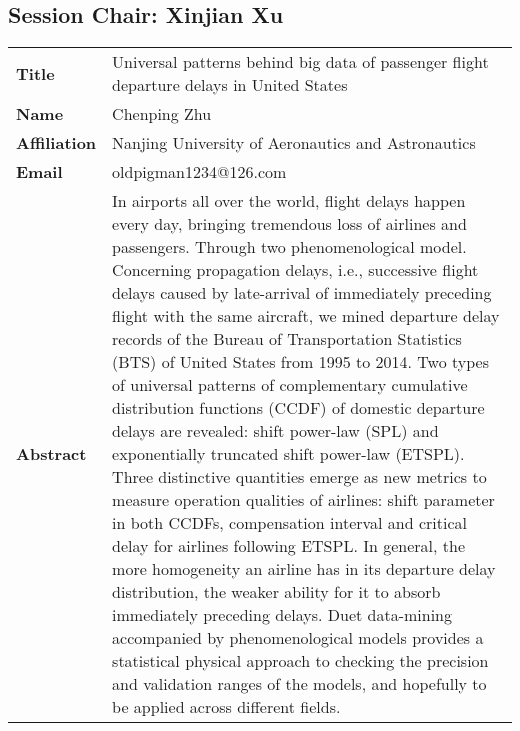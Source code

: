 \documentclass[oneside,A4paper,12pt]{article}
\begin{document}
\newpage
\subsection*{Session \uppercase\expandafter{}  \hspace{10mm} Chair: Xinjian Xu}
\label{sec:org876a3d0}

\begin{longtable}{p{2cm}p{14cm}}
\toprule
\textbf{Title} & Universal patterns behind big data of passenger flight departure delays in United States\\
\textbf{Name} & Chenping Zhu\\
\textbf{Affiliation} & Nanjing University of Aeronautics and Astronautics\\
\textbf{Email} & oldpigman1234@126.com\\
\textbf{Abstract} & In airports all over the world, flight delays happen every day, bringing tremendous loss of airlines and passengers. Through two phenomenological model. Concerning propagation delays, i.e., successive flight delays caused by late-arrival of immediately preceding flight with the same aircraft, we mined departure delay records of the Bureau of Transportation Statistics (BTS) of United States from 1995 to 2014. Two types of universal patterns of complementary cumulative distribution functions (CCDF) of domestic departure delays are revealed: shift power-law (SPL) and exponentially truncated shift power-law (ETSPL). Three distinctive quantities emerge as new metrics to measure operation qualities of airlines: shift parameter  in both CCDFs, compensation interval  and critical delay  for airlines following ETSPL. In general, the more homogeneity an airline has in its departure delay distribution, the weaker ability for it to absorb immediately preceding delays. Duet data-mining accompanied by phenomenological models provides a statistical physical approach to checking the precision and validation ranges of the models, and hopefully to be applied across different fields.\\
\bottomrule
\end{longtable}
\end{document}
